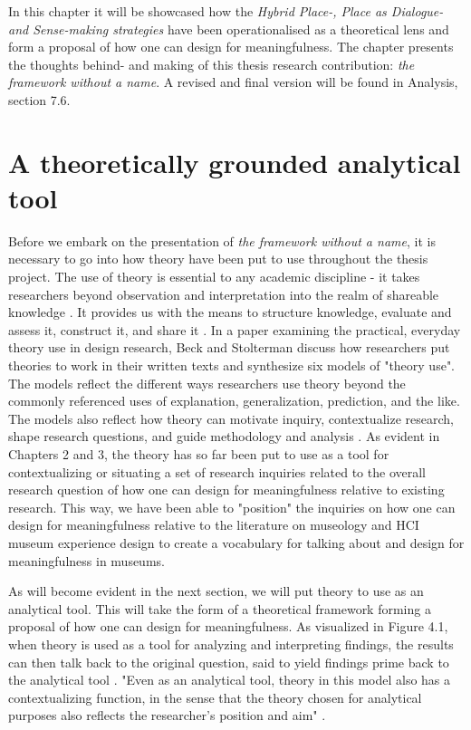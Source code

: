 In this chapter it will be showcased how the \emph{Hybrid Place-, Place as Dialogue- and Sense-making strategies} have been operationalised as a theoretical lens and form a proposal of how one can design for meaningfulness. The chapter presents the thoughts behind- and making of this thesis research contribution: \emph{the framework without a name}. A revised and final version will be found in Analysis, section 7.6.

\section{A theoretically grounded analytical tool}
Before we embark on the presentation of \emph{the framework without a name}, it is necessary to go into how theory have been put to use throughout the thesis project. The use of theory is essential to any academic discipline - it takes researchers beyond observation and interpretation into the realm of shareable knowledge \autocite[p. 126]{beck_examining_2016}. It provides us with the means to structure knowledge, evaluate and assess it, construct it, and share it \autocite[p. 126]{beck_examining_2016}. In a paper examining the practical, everyday theory use in design research, Beck and Stolterman discuss how researchers put theories to work in their written texts and synthesize six models of "theory use". The models reflect the different ways researchers use theory beyond the commonly referenced uses of explanation, generalization, prediction, and the like. The models also reflect how theory can motivate inquiry, contextualize research, shape research questions, and guide methodology and analysis \autocite[p. 134]{beck_examining_2016}. As evident in Chapters 2 and 3, the theory has so far been put to use as a tool for contextualizing or situating a set of research inquiries related to the overall research question of how one can design for meaningfulness relative to existing research. This way, we have been able to "position" the inquiries on how one can design for meaningfulness relative to the literature on museology and HCI museum experience design to create a vocabulary for talking about and design for meaningfulness in museums.

As will become evident in the next section, we will put theory to use as an analytical tool. This will take the form of a theoretical framework forming a proposal of how one can design for meaningfulness. As visualized in Figure 4.1, when theory is used as a tool for analyzing and interpreting findings, the results can then talk back to the original question, said to yield findings prime back to the analytical tool \autocite[p. 133]{beck_examining_2016}. "Even as an analytical tool, theory in this model also has a contextualizing function, in the sense that the theory chosen for analytical purposes also reflects the researcher’s position and aim" \autocite[p. 133]{beck_examining_2016}.

